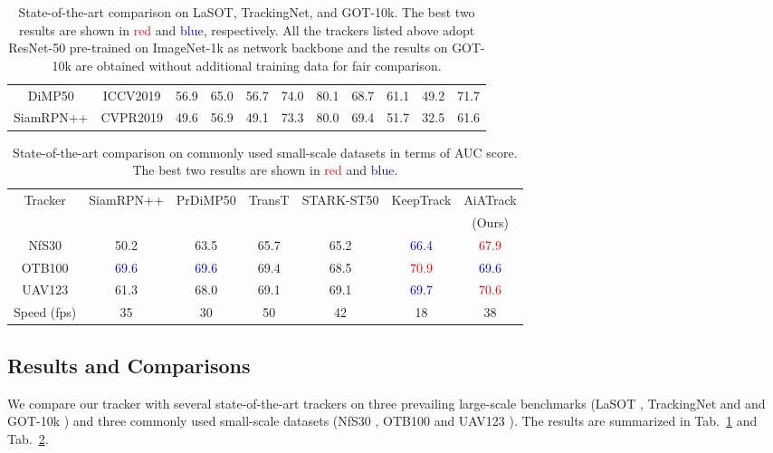\begin{table}[t]
\begin{tabular}{c|c|ccc|ccc|ccc}
DiMP50 \cite{bhat2019learning} & ICCV2019 & 
56.9 & 65.0 & 56.7 & 74.0 & 80.1 & 68.7 & 61.1 & 49.2 & 71.7 \\
SiamRPN++ \cite{li2019siamrpn++} & CVPR2019 & 
49.6 & 56.9 & 49.1 & 73.3 & 80.0 & 69.4 & 51.7 & 32.5 & 61.6 \\
\hline
\end{tabular}
\caption{State-of-the-art comparison on LaSOT, TrackingNet, and GOT-10k. The best two results are shown in \textcolor{red}{red} and \textcolor{blue}{blue}, respectively. All the trackers listed above adopt ResNet-50 pre-trained on ImageNet-1k as network backbone and the results on GOT-10k are obtained without additional training data for fair comparison.}
\label{table-large}
\end{table}

\begin{table}[t]
\centering
\begin{tabular}{c|cccccc}
\hline
\multirow{2}{*}{Tracker}
& SiamRPN++ & PrDiMP50 & TransT & STARK-ST50 & KeepTrack & AiATrack \\
& \cite{li2019siamrpn++} & \cite{danelljan2020probabilistic} & \cite{chen2021transformer} & \cite{yan2021learning} & \cite{mayer2021learning} & (Ours) \\
\hline
NfS30 \cite{kiani2017need} & 50.2 & 63.5 & 65.7 & 65.2 & \textcolor{blue}{66.4} & \textcolor{red}{67.9} \\
OTB100 \cite{wu2015object} & \textcolor{blue}{69.6} & \textcolor{blue}{69.6} & 69.4 & 68.5 & \textcolor{red}{70.9} & \textcolor{blue}{69.6} \\
UAV123 \cite{mueller2016benchmark} & 61.3 & 68.0 & 69.1 & 69.1 & \textcolor{blue}{69.7} & \textcolor{red}{70.6} \\
\hline
Speed (fps) & 35 & 30 & 50 & 42 & 18 & 38 \\
\hline
\end{tabular}
\caption{State-of-the-art comparison on commonly used small-scale datasets in terms of AUC score. The best two results are shown in \textcolor{red}{red} and \textcolor{blue}{blue}.}
\label{table-small}
\end{table}

\subsection{Results and Comparisons}\label{section-comparison}
We compare our tracker with several state-of-the-art trackers on three prevailing large-scale benchmarks (LaSOT \cite{fan2019lasot}, TrackingNet and \cite{muller2018trackingnet} and GOT-10k \cite{huang2019got}) and three commonly used small-scale datasets (NfS30 \cite{kiani2017need}, OTB100 \cite{wu2015object} and UAV123 \cite{mueller2016benchmark}). The results are summarized in Tab.~\ref{table-large} and Tab.~\ref{table-small}.

